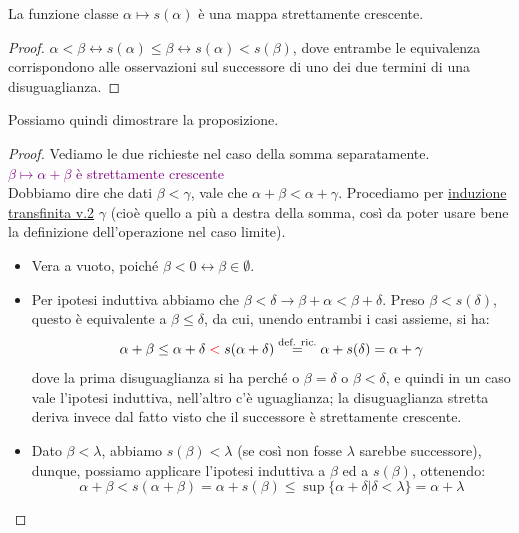 \begin{note}
	La funzione classe $\alpha \mapsto s(\alpha)$ \`e una mappa strettamente crescente.
\end{note}

\begin{proof}
	$\alpha < \beta \leftrightarrow s(\alpha) \leq \beta \leftrightarrow s(\alpha) < s(\beta)$, dove entrambe le equivalenza corrispondono alle osservazioni sul successore di uno dei due termini di una disuguaglianza.
\end{proof}

Possiamo quindi dimostrare la proposizione.

\begin{proof}
	Vediamo le due richieste nel caso della somma separatamente.\\
	\textcolor{purple}{$\beta \mapsto \alpha + \beta$ \`e strettamente crescente}\\
	Dobbiamo dire che dati $\beta < \gamma$, vale che $\alpha + \beta < \alpha + \gamma$. Procediamo per \hyperref[induz_transf2]{induzione transfinita v.2} $\gamma$ (cio\`e quello a pi\`u a destra della somma, cos\`i da poter usare bene la definizione dell'operazione nel caso limite).
	\begin{itemize}
		\item[$\boxed{\text{caso $\gamma = 0$}}$] Vera a vuoto, poich\'e $\beta < 0 \leftrightarrow \beta \in \emptyset$.
		\item[$\boxed{\text{caso $\gamma = s(\delta)$}}$] Per ipotesi induttiva abbiamo che $\beta < \delta \rightarrow \beta + \alpha < \beta + \delta$. Preso $\beta < s(\delta)$, questo \`e equivalente a  $\beta \leq \delta$, da cui, unendo entrambi i casi assieme, si ha:
		\[ \alpha + \beta \leq \alpha + \delta \;\textcolor{red}{<}\; s(\alpha + \delta) \overset{\text{def. ric.}}{=} \alpha + s(\delta) = \alpha + \gamma
			\]
		dove la prima disuguaglianza si ha perch\'e o $\beta = \delta$ o $\beta < \delta$, e quindi in un caso vale l'ipotesi induttiva, nell'altro c'\`e uguaglianza; la disuguaglianza stretta deriva invece dal fatto visto che il successore \`e strettamente crescente.
		\item[$\boxed{\text{caso $\gamma = \lambda$ limite}}$] Dato $\beta < \lambda$, abbiamo $s(\beta) < \lambda$ (se cos\`i non fosse $\lambda$ sarebbe successore), dunque, possiamo applicare l'ipotesi induttiva a $\beta$ ed a $s(\beta)$, ottenendo:
		\[ \alpha + \beta < s(\alpha + \beta) =  \alpha + s(\beta) \leq \sup\{\alpha + \delta | \delta < \lambda\} = \alpha + \lambda
\]
\end{itemize}
\end{proof}
